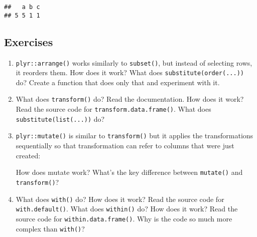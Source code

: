 \begin{verbatim}
##   a b c
## 5 5 1 1
\end{verbatim}

\hypertarget{exercises-2}{%
\subsection{Exercises}\label{exercises-2}}

\begin{enumerate}
\def\labelenumi{\arabic{enumi}.}
\item
  \texttt{plyr::arrange()} works similarly to \texttt{subset()}, but
  instead of selecting rows, it reorders them. How does it work? What
  does \texttt{substitute(order(...))} do? Create a function that does
  only that and experiment with it.
\item
  What does \texttt{transform()} do? Read the documentation. How does it
  work? Read the source code for \texttt{transform.data.frame()}. What
  does \texttt{substitute(list(...))} do?
\item
  \texttt{plyr::mutate()} is similar to \texttt{transform()} but it
  applies the transformations sequentially so that transformation can
  refer to columns that were just created:

\begin{Shaded}
\begin{Highlighting}[]
\StringTok{ }\NormalTok{(} \OperatorTok{:}\NormalTok{)}
\OperatorTok{*}\StringTok{ }\OperatorTok{*}\StringTok{ }
\OperatorTok{::}\OperatorTok{*}\StringTok{ }\OperatorTok{*}\StringTok{ }
\end{Highlighting}
\end{Shaded}

  How does mutate work? What's the key difference between
  \texttt{mutate()} and \texttt{transform()}?
\item
  What does \texttt{with()} do? How does it work? Read the source code
  for \texttt{with.default()}. What does \texttt{within()} do? How does
  it work? Read the source code for \texttt{within.data.frame()}. Why is
  the code so much more complex than \texttt{with()}?
\end{enumerate}

